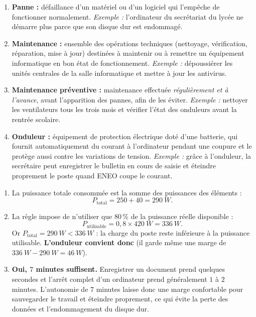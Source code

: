 \documentclass[11pt]{article}
\begin{document}
\begin{corrige}
\begin{enumerate}
\item \textbf{Panne :} défaillance d'un matériel ou d'un logiciel qui l'empêche de fonctionner normalement. \emph{Exemple :} l'ordinateur du secrétariat du lycée ne démarre plus parce que son disque dur est endommagé.
\item \textbf{Maintenance :} ensemble des opérations techniques (nettoyage, vérification, réparation, mise à jour) destinées à maintenir ou à remettre un équipement informatique en bon état de fonctionnement. \emph{Exemple :} dépoussiérer les unités centrales de la salle informatique et mettre à jour les antivirus.
\item \textbf{Maintenance préventive :} maintenance effectuée \emph{régulièrement et à l'avance}, avant l'apparition des pannes, afin de les éviter. \emph{Exemple :} nettoyer les ventilateurs tous les trois mois et vérifier l'état des onduleurs avant la rentrée scolaire.
\item \textbf{Onduleur :} équipement de protection électrique doté d'une batterie, qui fournit automatiquement du courant à l'ordinateur pendant une coupure et le protège aussi contre les variations de tension. \emph{Exemple :} grâce à l'onduleur, la secrétaire peut enregistrer le bulletin en cours de saisie et éteindre proprement le poste quand ENEO coupe le courant.
\end{enumerate}
\end{corrige}

\begin{corrige}
\begin{enumerate}
\item La puissance totale consommée est la somme des puissances des éléments :
\[ P_{\text{total}} = 250 + 40 = \SI{290}{W}. \]
\item La règle impose de n'utiliser que $80\,\%$ de la puissance réelle disponible :
\[ P_{\text{utilisable}} = 0{,}8 \times \SI{420}{W} = \SI{336}{W}. \]
Or $P_{\text{total}} = \SI{290}{W} < \SI{336}{W}$ : la charge du poste reste inférieure à la puissance utilisable. \textbf{L'onduleur convient donc} (il garde même une marge de $\SI{336}{W} - \SI{290}{W} = \SI{46}{W}$).
\item \textbf{Oui, $7$ minutes suffisent.} Enregistrer un document prend quelques secondes et l'arrêt complet d'un ordinateur prend généralement $1$ à $2$ minutes. L'autonomie de $7$ minutes laisse donc une marge confortable pour sauvegarder le travail et éteindre proprement, ce qui évite la perte des données et l'endommagement du disque dur.
\end{enumerate}
\end{corrige}
\end{document}
